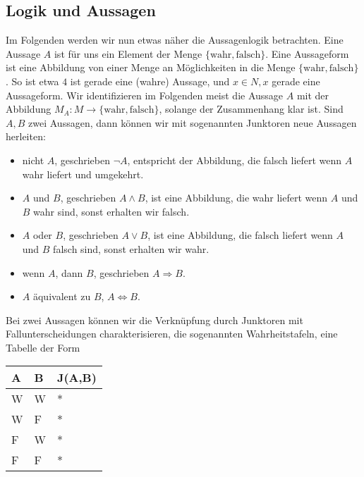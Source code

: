 \documentclass[letterpaper,10pt,english]{jupyterBook}
\begin{document}
\subsection{Logik und Aussagen}
\label{\detokenize{grundlagen/mengenlogik:logik-und-aussagen}}
Im Folgenden werden wir nun etwas näher die Aussagenlogik betrachten. Eine Aussage \(A\) ist für uns ein Element der Menge \(\{\text{wahr},\text{falsch}\}\). Eine Aussageform ist eine Abbildung von einer Menge an Möglichkeiten in die Menge \(\{\text{wahr},\text{falsch}\}\). So ist etwa \(4\) ist gerade eine (wahre) Aussage, und \(x \in N, x\) gerade eine Aussageform. Wir identifizieren im Folgenden meist die Aussage \(A\) mit der Abbildung \(M_A:M \rightarrow \{\text{wahr},\text{falsch}\}\), solange der Zusammenhang klar ist.
Sind \(A,B\) zwei Aussagen, dann können wir mit sogenannten Junktoren neue Aussagen herleiten:
\begin{itemize}
\item {} 
 nicht \(A\), geschrieben \(\lnot A\), entspricht der Abbildung, die falsch liefert wenn \(A\) wahr liefert und umgekehrt.

\item {} 
 \(A\) und \(B\), geschrieben \(A \land B\), ist eine Abbildung, die wahr liefert wenn \(A\) und \(B\) wahr sind, sonst erhalten wir falsch.

\item {} 
 \(A\) oder \(B\), geschrieben \(A \lor B\), ist eine Abbildung, die falsch liefert wenn \(A\) und \(B\) falsch sind, sonst erhalten wir wahr.

\item {} 
 wenn \(A\), dann \(B\), geschrieben \(A \Rightarrow B\).

\item {} 
 \(A\) äquivalent zu \(B\), \(A \Leftrightarrow B\).

\end{itemize}

Bei zwei Aussagen können wir die Verknüpfung durch Junktoren mit Fallunterscheidungen charakterisieren, die sogenannten Wahrheitstafeln, eine Tabelle der Form


\begin{savenotes}\sphinxattablestart
\centering
\begin{tabulary}{\linewidth}[t]{|T|T|T|}
\hline
\sphinxstyletheadfamily 
A
&\sphinxstyletheadfamily 
B
&\sphinxstyletheadfamily 
J(A,B)
\\
\hline
W
&
W
&
*
\\
\hline
W
&
F
&
*
\\
\hline
F
&
W
&
*
\\
\hline
F
&
F
&
*
\\
\hline
\end{tabulary}
\par
\sphinxattableend\end{savenotes}
\end{document}
